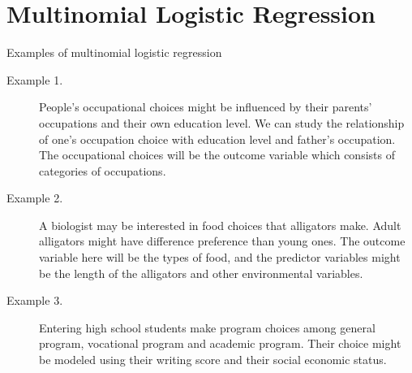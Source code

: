 \section{Multinomial Logistic Regression}
Examples of multinomial logistic regression

\begin{description}
	\item[Example 1.] People's occupational choices might be influenced by their parents' occupations and their own education level. We can study the relationship of one's occupation choice with education level and father's occupation.  The occupational choices will be the outcome variable which consists of categories of occupations.
	
	\item[Example 2.] A biologist may be interested in food choices that alligators make. Adult alligators might have difference preference than young ones. The outcome variable here will be the types of food, and the predictor variables might be the length of the alligators and other environmental variables.
	
	\item[Example 3.] Entering high school students make program choices among general program, vocational program and academic program. Their choice might be modeled using their writing score and their social economic status.
\end{description}